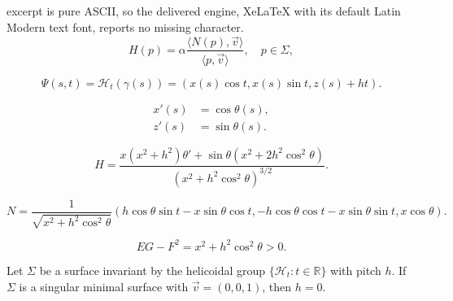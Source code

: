 \documentclass[10pt,a4paper]{amsart}
\def\r{\mathbb R}
\def\v{\vec{v}}
\begin{document}
excerpt is pure ASCII, so the delivered engine, XeLaTeX with its default Latin Modern text font, reports no missing character.
\begin{equation}\label{eq1}
H(p)=\alpha\frac{\langle N(p),\v\rangle}{\langle p,\vec{v}\rangle},\quad p\in\Sigma,
\end{equation}

\begin{equation}\label{para}
\Psi(s,t)=\mathcal{H}_t(\gamma(s))=(x(s)\cos t,x(s)\sin t,z(s)+ht).
\end{equation}

\begin{equation}\label{arc}
\begin{split}
x'(s)&=\cos\theta(s),\\
z'(s)&=\sin\theta(s).
\end{split}
\end{equation}

\begin{equation}\label{mean2}
H=  \frac{x (x^2+h^2) \theta '+\sin\theta  \left(x^2+2 h^2 \cos ^2\theta \right)}{ (x^2+h^2 \cos ^2\theta )^{3/2}}.
\end{equation}

\begin{equation}\label{normal2}
N=\frac{1}{\sqrt{x^2+h^2\cos ^2\theta}}\left(h\cos\theta\sin t-x\sin\theta\cos t,-h\cos\theta\cos t-x\sin\theta\sin t,x\cos\theta\right).
\end{equation}

\begin{equation}\label{reg}
EG-F^2=x^2+h^2 \cos ^2\theta>0.
\end{equation}

\begin{proposition} \label{pr1}
Let $\Sigma$ be a   surface invariant by the helicoidal group $\{\mathcal{H}_t\colon t\in\r\}$ with pitch $h$.  If $\Sigma$ is a singular minimal surface with $\vec{v}=(0,0,1)$, then $h=0$.
\end{proposition}
\end{document}
